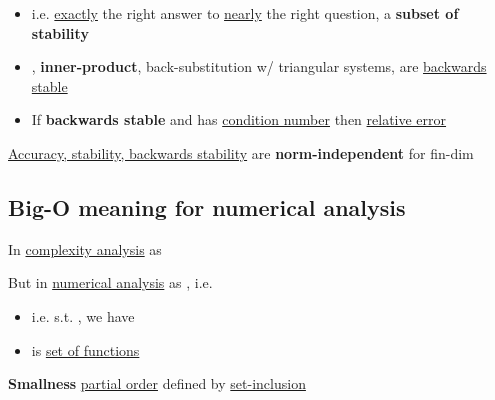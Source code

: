 \begin{itemize}

      \item
            i.e. \underline{exactly} the right answer to \underline{nearly} the right question,
            a \textbf{subset of stability}
      \item
            \iMbox{\oplus, \ominus, \otimes, \oslash}, \textbf{inner-product},
            back-substitution w/ triangular systems, are \underline{backwards stable}
      \item
            If \textbf{backwards stable}  and  has
            \underline{condition number}  then \underline{relative error}
\end{itemize}

\underline{Accuracy, stability, backwards stability} are \textbf{norm-independent} for fin-dim 

\subsection*{Big-O meaning for numerical analysis}

In \underline{complexity analysis}  as 

But in \underline{numerical analysis}  as ,
i.e. 

\begin{itemize}
      \item
            i.e.  s.t. \iMbox{\forall \epsilon}, we have
      \item
             is \underline{set of functions}
\end{itemize}

\hSep %

\textbf{Smallness} \underline{partial order} 
defined by \underline{set-inclusion} 


